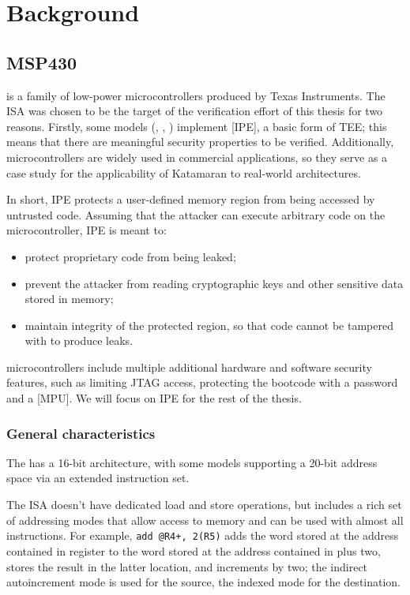 \chapter{Background}
\label{ch:background}

\section[\texorpdfstring{\msp}{MSP430}]{MSP430}

\msp is a family of low-power microcontrollers produced by Texas Instruments. The \msp ISA was chosen to be the target of the verification effort of this thesis for two reasons. Firstly, some models (\msp[FR58xx], \msp[FR59xx], \msp[FR6xx]) implement [IPE], a basic form of TEE; this means that there are meaningful security properties to be verified. Additionally, \msp microcontrollers are widely used in commercial applications, so they serve as a case study for the applicability of Katamaran to real-world architectures.

In short, IPE protects a user-defined memory region from being accessed by untrusted code. Assuming that the attacker can execute arbitrary code on the microcontroller, IPE is meant to:
\begin{itemize}
\item protect proprietary code from being leaked;
\item prevent the attacker from reading cryptographic keys and other sensitive data stored in memory;
\item maintain integrity of the protected region, so that code cannot be tampered with to produce leaks.
\end{itemize}

\msp microcontrollers include multiple additional hardware and software security features, such as limiting JTAG access, protecting the bootcode with a password \cite{slaa685} and a [MPU]. We will focus on IPE for the rest of the thesis.

\subsection{General characteristics}

The \msp has a 16-bit architecture, with some models supporting a 20-bit address space via an extended instruction set.

The ISA doesn't have dedicated load and store operations, but includes a rich set of addressing modes that allow access to memory and can be used with almost all instructions. For example, \texttt{add @R4+, 2(R5)} adds the word stored at the address contained in register  to the word stored at the address contained in  plus two, stores the result in the latter location, and increments  by two; the indirect autoincrement mode is used for the source, the indexed mode for the destination.

